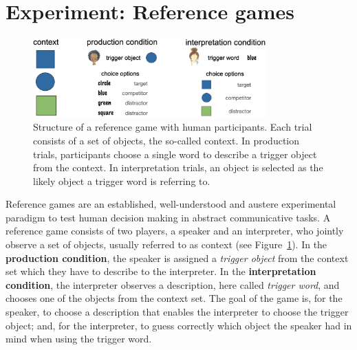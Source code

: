 \documentclass[fleqn]{article}
\begin{document}
\section{Experiment: Reference games}
\label{experiment-reference-games}

\begin{figure}
  \centering

  \includegraphics[width = 0.8\textwidth]{00-pics/reference-game.png}

  \caption{Structure of a reference game with human participants. Each trial consists of a set of objects, the so-called context. In production trials, participants choose a single word to describe a trigger object from the context. In interpretation trials, an object is selected as the likely object a trigger word is referring to.}
  \label{fig:ref-game}
\end{figure}

Reference games are an established, well-understood and austere experimental paradigm to test human decision making in abstract communicative tasks.
A reference game consists of two players, a speaker and an interpreter, who jointly observe a set of objects, usually referred to as context (see Figure~\ref{fig:ref-game}).
In the \textbf{production condition}, the speaker is assigned a \emph{trigger object} from the context set which they have to describe to the interpreter.
In the \textbf{interpretation condition}, the interpreter observes a description, here called \emph{trigger word}, and chooses one of the objects from the context set.
The goal of the game is, for the speaker, to choose a description that enables the interpreter to choose the trigger object; and, for the interpreter, to guess correctly which object the speaker had in mind when using the trigger word.
\end{document}

